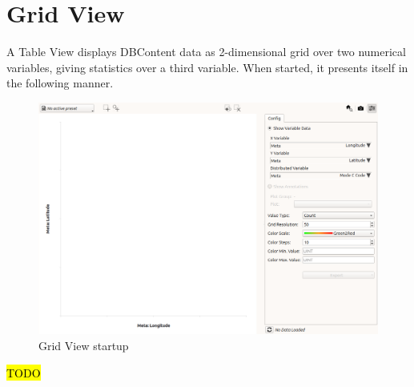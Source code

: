 \chapter{Grid View}
\label{sec:grid_view}

A Table View displays DBContent data as 2-dimensional grid over two numerical variables, giving statistics over a third variable. When started, it presents itself in the following manner.

\begin{figure}[H]
    \hspace*{-2cm}
    \includegraphics[width=18cm,frame]{figures/grid_start.png}
  \caption{Grid View startup}
\end{figure}

\hl{TODO}
